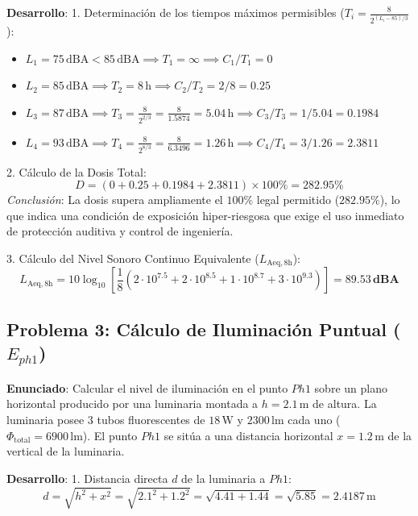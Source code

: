 \documentclass[]{informeutn}
\begin{document}
\textbf{Desarrollo}:
1. Determinación de los tiempos máximos permisibles ($T_i = \frac{8}{2^{(L_i - 85)/3}}$):
\begin{itemize}
    \item $L_1 = 75\,\text{dBA} < 85\,\text{dBA} \implies T_1 = \infty \implies C_1/T_1 = 0$
    \item $L_2 = 85\,\text{dBA} \implies T_2 = 8\,\text{h} \implies C_2/T_2 = 2/8 = 0.25$
    \item $L_3 = 87\,\text{dBA} \implies T_3 = \frac{8}{2^{2/3}} = \frac{8}{1.5874} = 5.04\,\text{h} \implies C_3/T_3 = 1/5.04 = 0.1984$
    \item $L_4 = 93\,\text{dBA} \implies T_4 = \frac{8}{2^{8/3}} = \frac{8}{6.3496} = 1.26\,\text{h} \implies C_4/T_4 = 3/1.26 = 2.3811$
\end{itemize}

2. Cálculo de la Dosis Total:
\begin{equation}
D = (0 + 0.25 + 0.1984 + 2.3811) \times 100\% = \mathbf{282.95\%}
\end{equation}
\textit{Conclusión}: La dosis supera ampliamente el $100\%$ legal permitido ($282.95\%$), lo que indica una condición de exposición hiper-riesgosa que exige el uso inmediato de protección auditiva y control de ingeniería.

3. Cálculo del Nivel Sonoro Continuo Equivalente ($L_{\text{Aeq},8\text{h}}$):
\begin{equation}
L_{\text{Aeq},8\text{h}} = 10 \log_{10} \left[ \frac{1}{8} \left( 2 \cdot 10^{7.5} + 2 \cdot 10^{8.5} + 1 \cdot 10^{8.7} + 3 \cdot 10^{9.3} \right) \right] = \mathbf{89.53\,\text{dBA}}
\end{equation}

\subsection{Problema 3: Cálculo de Iluminación Puntual (\texorpdfstring{$E_{ph1}$}{Eph1})}
\textbf{Enunciado}: Calcular el nivel de iluminación en el punto $Ph1$ sobre un plano horizontal producido por una luminaria montada a $h = 2.1\,\text{m}$ de altura. La luminaria posee 3 tubos fluorescentes de $18\,\text{W}$ y $2300\,\text{lm}$ cada uno ($\Phi_{\text{total}} = 6900\,\text{lm}$). El punto $Ph1$ se sitúa a una distancia horizontal $x = 1.2\,\text{m}$ de la vertical de la luminaria.

\textbf{Desarrollo}:
1. Distancia directa $d$ de la luminaria a $Ph1$:
\begin{equation}
d = \sqrt{h^2 + x^2} = \sqrt{2.1^2 + 1.2^2} = \sqrt{4.41 + 1.44} = \sqrt{5.85} = 2.4187\,\text{m}
\end{equation}
\end{document}
